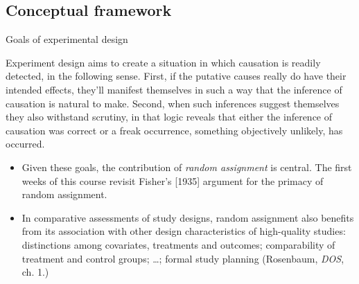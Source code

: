 \subsection{Conceptual framework}
\begin{frame}{Goals of experimental design}

Experiment design aims to create a situation in which causation is
readily detected, in the following sense. First, if the putative causes
really do have their intended effects, they'll manifest themselves in
such a way that the inference of causation is natural to make. Second,
when such inferences suggest themselves they also withstand scrutiny, in
that logic reveals that either the inference of causation was correct or
a freak occurrence, something objectively unlikely, has occurred.

\pause
\begin{itemize}[<+->]
\item Given these goals, the contribution of \textit{random
    assignment} is central.  The first weeks of this course revisit
  Fisher's [1935] argument for the primacy of random assignment.
\item In comparative assessments of study designs, random assignment also benefits
  from its association with other design characteristics of
  high-quality studies:  distinctions among covariates, treatments and
  outcomes; comparability of treatment and control groups; \ldots;
  formal study planning (Rosenbaum, \textit{DOS}, ch. 1.)
\end{itemize}

\end{frame}

